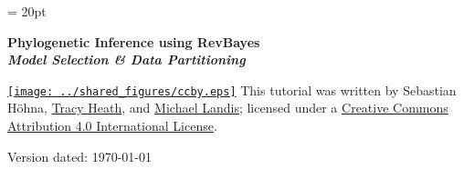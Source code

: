 \documentclass[11pt]{article}
\begin{document}
\renewcommand{\headrulewidth}{0.5pt}
\headsep = 20pt
\lhead{ }

\thispagestyle{plain}
\begin{center}

\textbf{\LARGE Phylogenetic Inference using RevBayes}\\\vspace{2mm}
\textbf{\it{\Large Model Selection \& Data Partitioning}}\\\vspace{2mm}
\end{center}



\href{http://creativecommons.org/licenses/by/4.0/}{\texttt{[image: ../shared\_figures/ccby.eps]}} This tutorial was written by Sebastian H\"{o}hna, \href{http://phylo.bio.ku.edu/content/tracy-heath}{Tracy Heath}, and \href{http://michaeljameslandis.com/}{Michael Landis}; licensed under a \href{http://creativecommons.org/licenses/by/4.0/}{Creative Commons Attribution 4.0 International License}. 

Version dated: \today



\printbibliography[heading=relevref]
\end{document}
